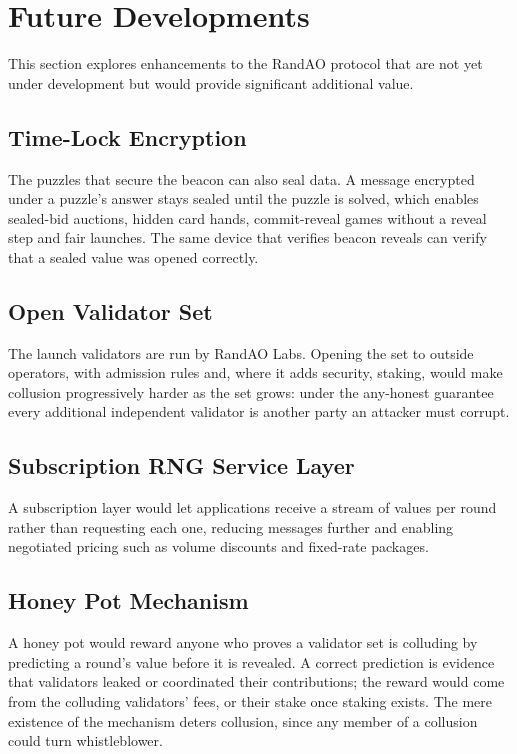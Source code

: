 \section{Future Developments}\label{sec:opportunities}

This section explores enhancements to the RandAO protocol that are not yet under development but would provide significant additional value.

\subsection{Time-Lock Encryption}\label{sec:timelock_encryption}
The puzzles that secure the beacon can also seal data. A message encrypted under a puzzle's answer stays sealed until the puzzle is solved, which enables sealed-bid auctions, hidden card hands, commit-reveal games without a reveal step and fair launches. The same device that verifies beacon reveals can verify that a sealed value was opened correctly.

\subsection{Open Validator Set}\label{sec:open_set}
The launch validators are run by RandAO Labs. Opening the set to outside operators, with admission rules and, where it adds security, staking, would make collusion progressively harder as the set grows: under the any-honest guarantee every additional independent validator is another party an attacker must corrupt.

\subsection{Subscription RNG Service Layer}\label{sec:subscription_service}
A subscription layer would let applications receive a stream of values per round rather than requesting each one, reducing messages further and enabling negotiated pricing such as volume discounts and fixed-rate packages.

\subsection{Honey Pot Mechanism}\label{sec:honey_pot}
A honey pot would reward anyone who proves a validator set is colluding by predicting a round's value before it is revealed. A correct prediction is evidence that validators leaked or coordinated their contributions; the reward would come from the colluding validators' fees, or their stake once staking exists. The mere existence of the mechanism deters collusion, since any member of a collusion could turn whistleblower.
